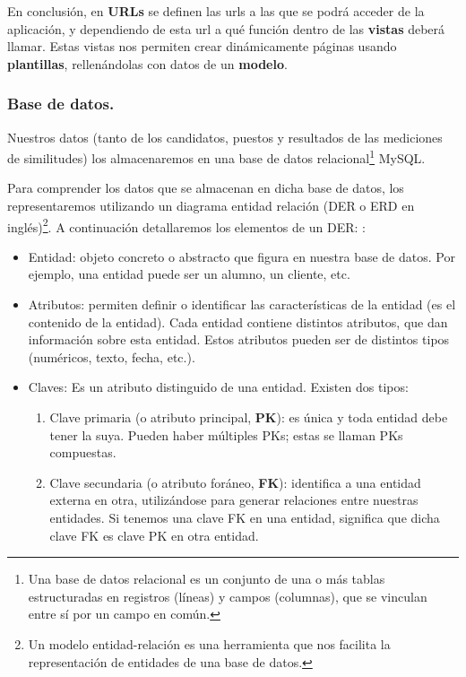 \documentclass[12pt,a4paper]{article}
\begin{document}
\begin{sloppypar}
En conclusión, en \textbf{URLs} se definen las urls a las que se podrá acceder de la aplicación, y dependiendo de esta url a qué función dentro de las \textbf{vistas} deberá llamar. Estas vistas nos permiten crear dinámicamente páginas usando \textbf{plantillas}, rellenándolas con datos de un \textbf{modelo}.

\cleardoublepage

\subsubsection{Base de datos.}

Nuestros datos (tanto de los candidatos, puestos y resultados de las mediciones de similitudes) los almacenaremos en una base de datos relacional\footnote{Una base de datos relacional es un conjunto de una o más tablas estructuradas en registros (líneas) y campos (columnas), que se vinculan entre sí por un campo en común.} MySQL.

Para comprender los datos que se almacenan en dicha base de datos, los representaremos utilizando un diagrama entidad relación (DER o ERD en inglés)\footnote{Un modelo entidad-relación es una herramienta que nos facilita la representación de entidades de una base de datos.}. A continuación detallaremos los elementos de un DER: \cite{mod_ent_relacion_barker}:

\begin{itemize}
\item Entidad: objeto concreto o abstracto que figura en nuestra base de datos. Por ejemplo, una entidad puede ser un alumno, un cliente, etc. 
\item Atributos: permiten definir o identificar las características de la entidad (es el contenido de la entidad). Cada entidad contiene distintos atributos, que dan información sobre esta entidad. Estos atributos pueden ser de distintos tipos (numéricos, texto, fecha, etc.).
\item Claves: Es un atributo distinguido de una entidad. Existen dos tipos:

\begin{enumerate}
\item Clave primaria (o atributo principal, \textbf{PK}): es única y toda entidad debe tener la suya. Pueden haber múltiples PKs; estas se llaman PKs compuestas. 
\item Clave secundaria (o atributo foráneo, \textbf{FK}): identifica a una entidad externa en otra, utilizándose para generar relaciones entre nuestras entidades. Si tenemos una clave FK en una entidad, significa que dicha clave FK es clave PK en otra entidad.
\end{enumerate}


\end{itemize}
\end{sloppypar}
\end{document}
